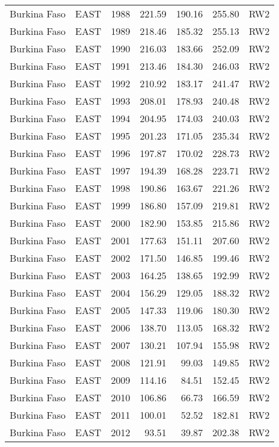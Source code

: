 \begin{longtable}{lllrrrl}
  Burkina Faso & EAST & 1988 & 221.59 & 190.16 & 255.80 & RW2 \\ 
  Burkina Faso & EAST & 1989 & 218.46 & 185.32 & 255.13 & RW2 \\ 
  Burkina Faso & EAST & 1990 & 216.03 & 183.66 & 252.09 & RW2 \\ 
  Burkina Faso & EAST & 1991 & 213.46 & 184.30 & 246.03 & RW2 \\ 
  Burkina Faso & EAST & 1992 & 210.92 & 183.17 & 241.47 & RW2 \\ 
  Burkina Faso & EAST & 1993 & 208.01 & 178.93 & 240.48 & RW2 \\ 
  Burkina Faso & EAST & 1994 & 204.95 & 174.03 & 240.03 & RW2 \\ 
  Burkina Faso & EAST & 1995 & 201.23 & 171.05 & 235.34 & RW2 \\ 
  Burkina Faso & EAST & 1996 & 197.87 & 170.02 & 228.73 & RW2 \\ 
  Burkina Faso & EAST & 1997 & 194.39 & 168.28 & 223.71 & RW2 \\ 
  Burkina Faso & EAST & 1998 & 190.86 & 163.67 & 221.26 & RW2 \\ 
  Burkina Faso & EAST & 1999 & 186.80 & 157.09 & 219.81 & RW2 \\ 
  Burkina Faso & EAST & 2000 & 182.90 & 153.85 & 215.86 & RW2 \\ 
  Burkina Faso & EAST & 2001 & 177.63 & 151.11 & 207.60 & RW2 \\ 
  Burkina Faso & EAST & 2002 & 171.50 & 146.85 & 199.46 & RW2 \\ 
  Burkina Faso & EAST & 2003 & 164.25 & 138.65 & 192.99 & RW2 \\ 
  Burkina Faso & EAST & 2004 & 156.29 & 129.05 & 188.32 & RW2 \\ 
  Burkina Faso & EAST & 2005 & 147.33 & 119.06 & 180.30 & RW2 \\ 
  Burkina Faso & EAST & 2006 & 138.70 & 113.05 & 168.32 & RW2 \\ 
  Burkina Faso & EAST & 2007 & 130.21 & 107.94 & 155.98 & RW2 \\ 
  Burkina Faso & EAST & 2008 & 121.91 & 99.03 & 149.85 & RW2 \\ 
  Burkina Faso & EAST & 2009 & 114.16 & 84.51 & 152.45 & RW2 \\ 
  Burkina Faso & EAST & 2010 & 106.86 & 66.73 & 166.59 & RW2 \\ 
  Burkina Faso & EAST & 2011 & 100.01 & 52.52 & 182.81 & RW2 \\ 
  Burkina Faso & EAST & 2012 & 93.51 & 39.87 & 202.38 & RW2 \\ 

\end{longtable}
